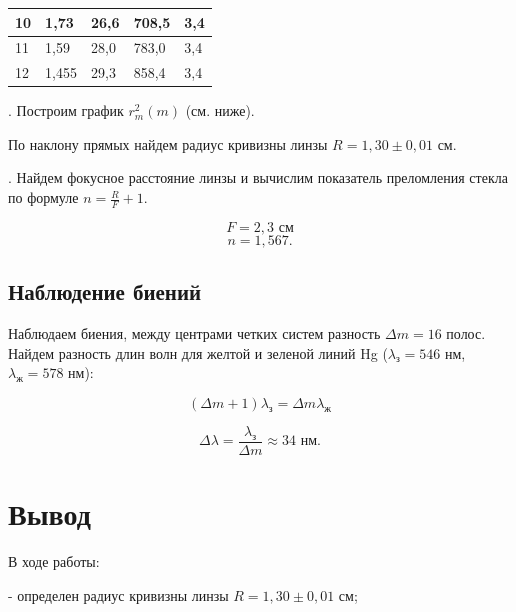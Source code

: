 \documentclass[a4paper,12pt]{article} %
\begin{document}
\begin{table}[h!]
\begin{tabular}{|lllll|}
\multicolumn{1}{|l|}{10}  & \multicolumn{1}{l|}{1,73}               & \multicolumn{1}{l|}{26,6}               & \multicolumn{1}{l|}{708,5}                  & 3,4                             \\ \hline
\multicolumn{1}{|l|}{11}  & \multicolumn{1}{l|}{1,59}               & \multicolumn{1}{l|}{28,0}               & \multicolumn{1}{l|}{783,0}                  & 3,4                             \\ \hline
\multicolumn{1}{|l|}{12}  & \multicolumn{1}{l|}{1,455}              & \multicolumn{1}{l|}{29,3}               & \multicolumn{1}{l|}{858,4}                  & 3,4                             \\ \hline
\end{tabular}
\end{table}

. Построим график $r_{m}^2(m)$ (см. ниже).

 \medskip


\noindent По наклону прямых найдем радиус кривизны линзы $R = 1,30 \pm 0,01 \text{ см}$. 

\medskip

. Найдем фокусное расстояние линзы и вычислим показатель преломления стекла по формуле $n = \frac{R}{F} + 1$.

$$F = 2,3 \text { см}$$
$$n = 1,567.$$


\subsection{Наблюдение биений}

\noindent Наблюдаем биения, между центрами четких систем разность $\Delta m = 16$ полос. Найдем разность длин волн для желтой и зеленой линий Hg ($ \lambda_\text{з} = 546 $ нм, $ \lambda_\text{ж} = 578  $ нм):

	$$(\Delta m + 1)\lambda_\text{з} = \Delta m \lambda_\text{ж}$$
	
	 $$\Delta \lambda = \dfrac{\lambda_\text{з}}{\Delta m} \approx 34 \text{ нм}.$$
 

\section{Вывод}

\noindent В ходе работы:

\medskip

\noindent - определен радиус кривизны линзы $R = 1,30 \pm 0,01 \text{ см}$;
\end{document}
